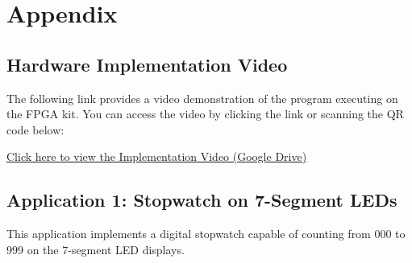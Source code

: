 \section{Appendix}


\subsection{Hardware Implementation Video}
The following link provides a video demonstration of the program executing on the FPGA kit. You can access the video by clicking the link or scanning the QR code below:

\begin{center}
	\href{https://drive.google.com/drive/u/3/folders/1d-ZMj_vs8g-kHeXnu3KJcHw9mhhGdeYM}{Click here to view the Implementation Video (Google Drive)}
	
	\vspace{0.5cm}
\end{center}

\subsection{Application 1: Stopwatch on 7-Segment LEDs}

This application implements a digital stopwatch capable of counting from 000 to 999 on the 7-segment LED displays.

